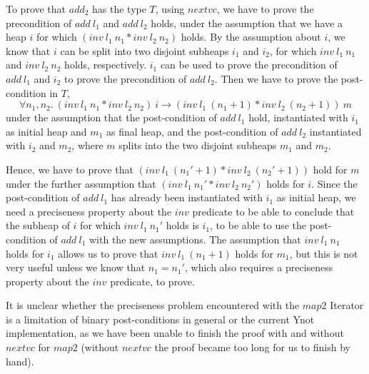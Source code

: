 \documentclass[a4paper,english]{article}
\begin{document}
To prove that $add_2$ has the type $T$, using $nextvc$, we have to prove the
precondition of $add\ l_1$ and $add\ l_2$ holds, under the assumption that we
have a heap $i$ for which $(inv\ l_1\ n_1 * inv\ l_2\ n_2)$ holds. By the
assumption about $i$, we know that $i$ can be split into two disjoint subheaps
$i_1$ and $i_2$, for which $inv\ l_1\ n_1$ and $inv\ l_2\ n_2$ holds,
respectively. $i_1$ can be used to prove the precondition of $add\ l_1$ and
$i_2$ to prove the precondition of $add\ l_2$. Then we have to prove the
post-condition in $T$,
$$\forall n_1, n_2.\ (inv\ l_1\ n_1 * inv\ l_2\ n_2)\ i \rightarrow (inv\ l_1\ (n_1+1) * inv\ l_2\ (n_2+1))\ m$$
under the assumption that the post-condition of $add\ l_1$ hold, instantiated
with $i_1$ as initial heap and $m_1$ as final heap, and the post-condition of
$add\ l_2$ instantiated with $i_2$ and $m_2$, where $m$ splits into the two
disjoint subheaps $m_1$ and $m_2$. 

Hence, we have to prove that $(inv\ l_1\ (n_1'+1) * inv\ l_2\ (n_2'+1))$ hold
for $m$ under the further assumption that $(inv\ l_1\ n_1' * inv\ l_2\ n_2')$
holds for $i$. Since the post-condition of $add\ l_1$ has already been
instantiated with $i_1$ as initial heap, we need a preciseness property about
the $inv$ predicate to be able to conclude that the subheap of $i$ for which
$inv\ l_1\ n_1'$ holds is $i_1$, to be able to use the post-condition of $add\
l_1$ with the new assumptions. The assumption that $inv\ l_1\ n_1$ holds for
$i_1$ allows us to prove that $inv\ l_1\ (n_1+1)$ holds for $m_1$, but this is
not very useful unless we know that $n_1 = n_1'$, which also requires a
preciseness property about the $inv$ predicate, to prove. 

It is unclear whether the preciseness problem encountered with the $map2$
Iterator is a limitation of binary post-conditions in general or the current
Ynot implementation, as we have been unable to finish the proof with and
without $nextvc$ for $map2$ (without $nextvc$ the proof became too long for us
to finish by hand). 


\end{document}
